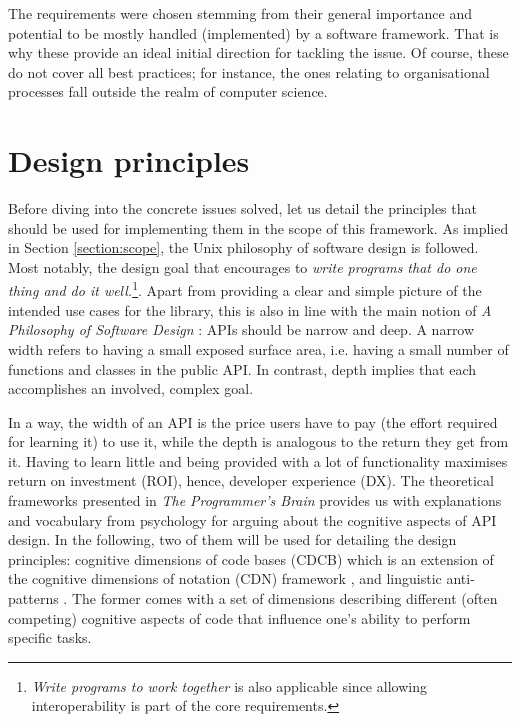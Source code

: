 The requirements were chosen stemming from their general importance and potential to be mostly handled (implemented) by a software framework. That is why these provide an ideal initial direction for tackling the issue. Of course, these do not cover all best practices; for instance, the ones relating to organisational processes fall outside the realm of computer science.

\section{Design principles} \label{section:principles}

Before diving into the concrete issues solved, let us detail the principles that should be used for implementing them in the scope of this framework. As implied in Section \ref{section:scope}, the Unix philosophy \cite{ritchie1978unix,salus1994quarter} of software design is followed. Most notably, the design goal that encourages to \textit{write programs that do one thing and do it well.}\footnote{\textit{Write programs to work together} is also applicable since allowing interoperability is part of the core requirements.}. Apart from providing a clear and simple picture of the intended use cases for the library, this is also in line with the main notion of \textit{A Philosophy of Software Design} \cite{ousterhout2018philosophy}: APIs should be narrow and deep. A narrow width refers to having a small exposed surface area, i.e. having a small number of functions and classes in the public API. In contrast, depth implies that each accomplishes an involved, complex goal. 

In a way, the width of an API is the price users have to pay (the effort required for learning it) to use it, while the depth is analogous to the return they get from it. Having to learn little and being provided with a lot of functionality maximises return on investment (ROI), hence, developer experience (DX). The theoretical frameworks presented in \textit{The Programmer's Brain} \cite{hermans2021programmer} provides us with explanations and vocabulary from psychology for arguing about the cognitive aspects of API design. In the following, two of them will be used for detailing the design principles: cognitive dimensions of code bases (CDCB) which is an extension of the cognitive dimensions of notation (CDN) framework \cite{blackwell2001cognitive}, and linguistic anti-patterns \cite{arnaoudova2016linguistic}. The former comes with a set of dimensions describing different (often competing) cognitive aspects of code that influence one's ability to perform specific tasks.

